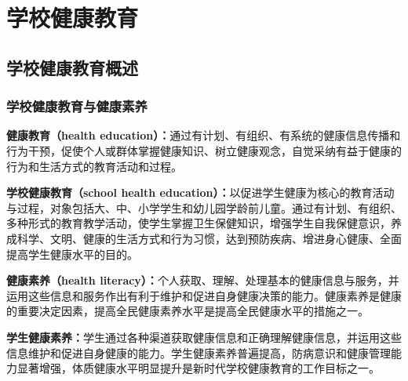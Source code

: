 \chapter{学校健康教育}
\setcounter{chapter}{17}

\section{学校健康教育概述}

\subsection{学校健康教育与健康素养}

\begin{defbox}
\textbf{健康教育（health education）：}通过有计划、有组织、有系统的健康信息传播和行为干预，促使个人或群体掌握健康知识、树立健康观念，自觉采纳有益于健康的行为和生活方式的教育活动和过程。

\textbf{学校健康教育（school health education）：}以促进学生健康为核心的教育活动与过程，对象包括大、中、小学学生和幼儿园学龄前儿童。通过有计划、有组织、多种形式的教育教学活动，使学生掌握卫生保健知识，增强学生自我保健意识，养成科学、文明、健康的生活方式和行为习惯，达到预防疾病、增进身心健康、全面提高学生健康水平的目的。
\end{defbox}

\begin{keybox}
\textbf{健康素养（health literacy）：}个人获取、理解、处理基本的健康信息与服务，并运用这些信息和服务作出有利于维护和促进自身健康决策的能力。健康素养是健康的重要决定因素，提高全民健康素养水平是提高全民健康水平的措施之一。

\textbf{学生健康素养：}学生通过各种渠道获取健康信息和正确理解健康信息，并运用这些信息维护和促进自身健康的能力。学生健康素养普遍提高，防病意识和健康管理能力显著增强，体质健康水平明显提升是新时代学校健康教育的工作目标之一。
\end{keybox}

